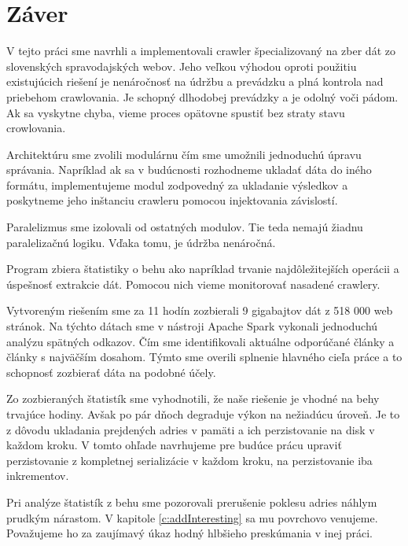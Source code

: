 
\chapter{Záver}
\label{summary}



V tejto práci sme navrhli a implementovali crawler špecializovaný na zber dát zo slovenských spravodajských webov. Jeho veľkou výhodou oproti použitiu existujúcich riešení je nenáročnosť na údržbu a prevádzku a plná kontrola nad priebehom crawlovania. Je schopný dlhodobej prevádzky a je odolný voči pádom. Ak sa vyskytne chyba, vieme proces opätovne spustiť bez straty stavu crowlovania. 

Architektúru sme zvolili modulárnu čím sme umožnili jednoduchú úpravu správania. Napríklad ak sa v budúcnosti rozhodneme ukladať dáta do iného formátu, implementujeme modul zodpovedný za ukladanie výsledkov a poskytneme jeho inštanciu crawleru pomocou injektovania závislostí.  

Paralelizmus sme izolovali od ostatných modulov. Tie teda nemajú žiadnu paralelizačnú logiku. Vďaka tomu, je údržba nenáročná. 

Program zbiera štatistiky o behu ako napríklad trvanie najdôležitejších operácii a úspešnosť extrakcie dát. Pomocou nich vieme monitorovať nasadené crawlery. 

Vytvoreným riešením sme za 11 hodín zozbierali 9 gigabajtov dát z 518 000 web stránok. Na týchto dátach sme v nástroji Apache Spark vykonali jednoduchú analýzu spätných odkazov. Čím sme identifikovali aktuálne odporúčané články a články s najväčším dosahom. Týmto sme overili splnenie hlavného cieľa práce a to schopnosť zozbierať dáta na podobné účely.  

Zo zozbieraných štatistík sme vyhodnotili, že naše riešenie je vhodné na behy trvajúce hodiny. Avšak po pár dňoch degraduje výkon na nežiadúcu úroveň. Je to z dôvodu ukladania prejdených adries v pamäti a ich perzistovanie na disk v každom kroku. V tomto ohľade navrhujeme pre budúce prácu upraviť perzistovanie z kompletnej serializácie v každom kroku, na perzistovanie iba inkrementov. 

Pri analýze štatistík z behu sme pozorovali prerušenie poklesu adries náhlym prudkým nárastom. V kapitole \ref{c:addInteresting} sa mu povrchovo venujeme. Považujeme ho za zaujímavý úkaz hodný hlbšieho preskúmania v inej práci.  

